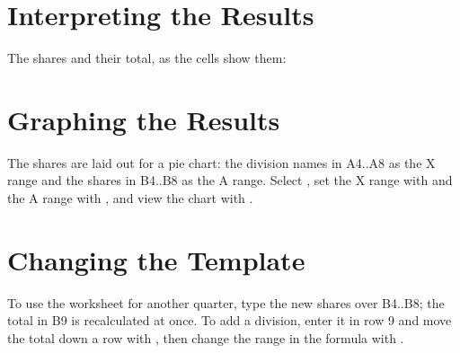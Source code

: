 \section{Interpreting the Results}
The shares and their total, as the cells show them:

\section{Graphing the Results}
The shares are laid out for a pie chart: the division names in A4..A8 as
the X range and the shares in B4..B8 as the A range.  Select
, set the X range with  and the
A range with , and view the chart with
.

\section{Changing the Template}
To use the worksheet for another quarter, type the new shares over B4..B8;
the total in B9 is recalculated at once.  To add a division, enter it in
row 9 and move the total down a row with , then change the
range in the formula with .
